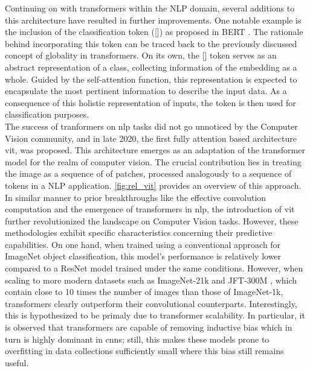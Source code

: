 Continuing on with transformers within the NLP domain, several additions 
to this architecture have resulted in further improvements. One notable example is the inclusion of 
the classification token ([]) as proposed in BERT \autocite{devlin2018bert}. The rationale 
behind incorporating this token can be traced back to the previously discussed concept of globality 
in transformers. On its own, the [] token serves as an abstract representation of a 
class, collecting information of the embedding as a whole. Guided by the 
self-attention function, this representation is expected to encapsulate the most pertinent 
information to describe the input data. As a consequence of this holistic representation of inputs, 
the token is then used for classification purposes.\\

\noindent The success of tranformers on \gls{nlp} tasks did not go unnoticed by the Computer Vision 
community, and in late 2020, the first fully attention based architecture \gls{vit}, was proposed.
This architecture emerges as an adaptation of the transformer model for the realm of computer vision. 
The crucial contribution lies in treating the image as a sequence of of patches, processed 
analogously to a sequence of tokens in a NLP application. \autoref{fig:rel_vit} provides an 
overview of this approach.\\



In similar manner to prior breakthroughs like the effective convolution computation and the 
emergence of transformers in \gls{nlp}, the introduction of \gls{vit} further revolutionized the 
landscape on Computer Vision tasks. However, these methodologies exhibit specific characteristics 
concerning their predictive capabilities. On one hand, when trained using a conventional 
approach for ImageNet object classification, this model's performance is relatively lower compared 
to a ResNet model trained under the same conditions. However, when scaling to more modern datasets 
such as ImageNet-21k and JFT-300M \autocite{sun2017revisiting}, which contain close to 10 times the 
number of images than those of ImageNet-1k, transformers clearly outperform their convolutional 
counterparts. Interestingly, this is hypothesized to be primaly due to transformer scalability. 
In particular, it is observed that transformers are capable of removing inductive bias which in 
turn is highly dominant in \glspl{cnn}; still, this makes these models prone to overfitting in data 
collections sufficiently small where this bias still remains useful.\\


